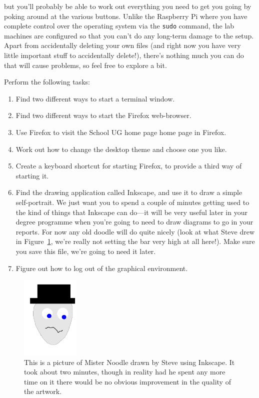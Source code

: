 \noindent but you'll probably be able to work out everything you need to get you going by poking around at the various buttons. Unlike the Raspberry Pi where you have complete control over the operating system via the \texttt{sudo} command, the lab machines are configured so that you can't do any long-term damage to the setup. Apart from accidentally deleting your own files (and right now you have very little important stuff to accidentally delete!), there's nothing much you can do that will cause problems, so feel free to explore a bit. 

Perform the following tasks:
\begin{enumerate}
\item Find two different ways to start a terminal window.
\item Find two different ways to start the Firefox web-browser. 
\item Use Firefox to visit the School UG home page
  home page in Firefox.
\item Work out how to change the desktop theme and choose one you like.
\item Create a keyboard shortcut for starting Firefox, to provide a third way of starting it.
\item Find the  drawing application called Inkscape, and use it to draw a simple self-portrait. We just want you to spend a couple of minutes getting used to the kind of things that Inkscape can do---it will be very useful later in your degree programme when you're going to need to draw diagrams to go in your reports. For now any old doodle will do quite nicely (look at what Steve drew in Figure~\ref{figure:mrnoodle}, we're really not setting the bar very high at all here!). Make sure you save this file, we're going to need it later.
\item Figure out how to log out of the graphical environment. \label{list:logout}
\end{enumerate}

\begin{figure}[t]
\centerline{\includegraphics[width=0.25\textwidth]{images/mrnoodle}}
\caption{This is a picture of Mister Noodle drawn by Steve using Inkscape. It took about two minutes, though in reality had he spent any more time on it there would be no obvious improvement in the quality of the artwork.}\label{figure:mrnoodle}
\end{figure}

